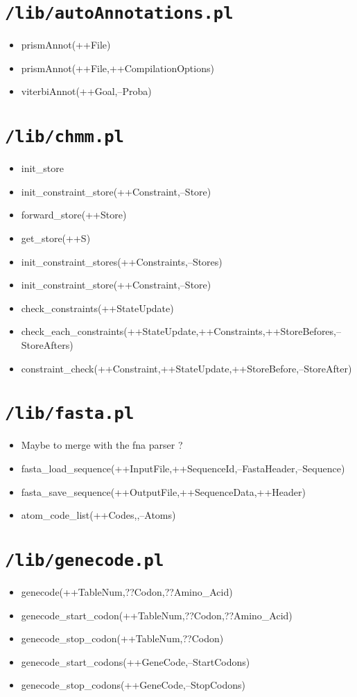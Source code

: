 \section{\texttt{/lib/autoAnnotations.pl}}
%
\begin{itemize}
\item prismAnnot(++File)
\item prismAnnot(++File,++CompilationOptions)
\item viterbiAnnot(++Goal,--Proba)
\end{itemize}


\section{\texttt{/lib/chmm.pl}}
%
\begin{itemize}
\item init\_store
\item init\_constraint\_store(++Constraint,--Store)
\item forward\_store(++Store)
\item get\_store(++S)
\item init\_constraint\_stores(++Constraints,--Stores)
\item init\_constraint\_store(++Constraint,--Store)
\item check\_constraints(++StateUpdate)
\item check\_each\_constraints(++StateUpdate,++Constraints,++StoreBefores,--StoreAfters)
\item constraint\_check(++Constraint,++StateUpdate,++StoreBefore,--StoreAfter)
\end{itemize}


\section{\texttt{/lib/fasta.pl}}
%
\begin{itemize}
\item Maybe to merge with the fna parser ?
\item fasta\_load\_sequence(++InputFile,++SequenceId,--FastaHeader,--Sequence) 
\item fasta\_save\_sequence(++OutputFile,++SequenceData,++Header) 
\item atom\_code\_list(++Codes,,--Atoms)
\end{itemize}

\section{\texttt{/lib/genecode.pl}}
%
\begin{itemize}
\item genecode(++TableNum,??Codon,??Amino\_Acid)
\item genecode\_start\_codon(++TableNum,??Codon,??Amino\_Acid)
\item genecode\_stop\_codon(++TableNum,??Codon)
\item genecode\_start\_codons(++GeneCode,--StartCodons)
\item genecode\_stop\_codons(++GeneCode,--StopCodons)
\end{itemize}

